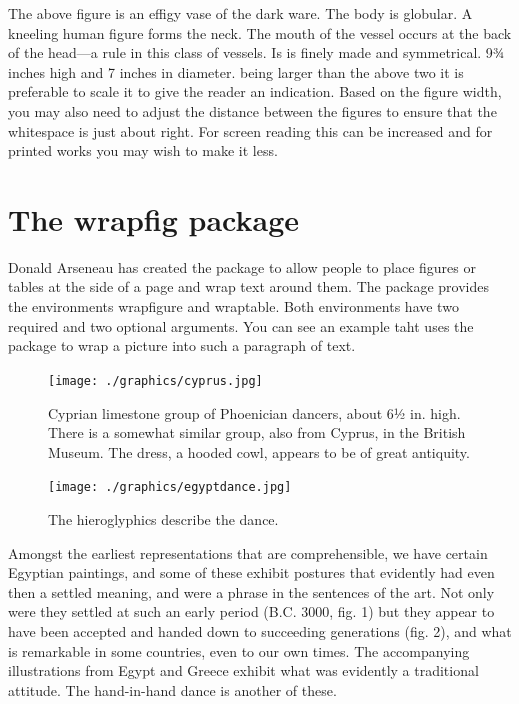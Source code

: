 The above figure is an effigy vase of the dark ware. The body is globular. A kneeling human figure forms the neck. The mouth of the vessel occurs at the back of the head—a rule in this class of vessels. Is is finely made and symmetrical. 9¾ inches high and 7 inches in diameter. being larger than the above two it is preferable to scale it to give the reader an indication. Based on the figure width, you may also need to adjust the distance between the figures to ensure that the whitespace is just about right. For screen reading this can be increased and for printed works you may wish to make it less.



\section{The wrapfig package}


\captionsetup[wrapfigure]{margin=10pt,font=small,labelfont=bf, name=Fig.} %


Donald Arseneau has created the  package to allow people to place figures or
tables at the side of a page and wrap text around them. The package provides the
environments wrapfigure and wraptable. Both environments have two required and
two optional arguments. You can see an example taht uses the package to wrap a picture into such a paragraph of text.

\begin{figure}[htbp]
   \texttt{[image: ./graphics/cyprus.jpg]} 
   \caption{\small Cyprian limestone group of Phoenician dancers, about 6½ in. high. There is a somewhat similar group, also from Cyprus, in the British Museum. The dress, a hooded cowl, appears to be of great antiquity.}
\end{figure}

\begin{figure}
\centering\small
\texttt{[image: ./graphics/egyptdance.jpg]}  
\caption{\small The hieroglyphics describe the dance.}
\end{figure}
Amongst the earliest representations that are comprehensible, we have certain Egyptian paintings, and some of these exhibit postures that evidently had even then a settled meaning, and were a phrase in the sentences of the art. Not only were they settled at such an early period (B.C. 3000, fig. 1) but they appear to have been accepted and handed down to succeeding generations (fig. 2), and what is remarkable in some countries, even to our own times. The accompanying illustrations from Egypt and Greece exhibit what was evidently a traditional attitude. The hand-in-hand dance is another of these.

